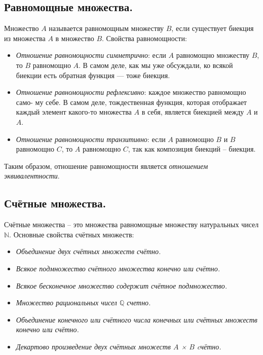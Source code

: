 \documentclass{article}
\begin{document}
\subsection{Равномощные множества.}
Множество $A$ называется равномощным множеству $B$, если существует биекция из множества $A$ в множество $B$.
\newline
Свойства равномощности:
\begin{itemize}
    \item \textit{Отношение равномощности симметрично}: если $A$ равномощно множеству $B$, то $B$ равномощно $A$. В самом деле, как мы уже обсуждали, ко всякой биекции есть обратная функция — тоже биекция.
    \item \textit{Отношение равномощности рефлексивно}: каждое множество равномощно само- му себе. В самом деле, тождественная функция, которая отображает каждый элемент какого-то множества $A$ в себя, является биекцией между $A$ и $A$.
    \item \textit{Отношение равномощности транзитивно}: если $A$ равномощно $B$ и $B$ равномощно $C$, то $A$ равномощно $C$, так как композиция биекций -- биекция.
\end{itemize}
Таким образом, отношение равномощности является \textit{отношением эквивалентности}.


\subsection{Счётные множества.}
Счётные множества -- это множества равномощные множеству натуральных чисел $\mathbb{N}$.
\newline
Основные свойства счётных множеств:
\begin{itemize}
    \item \textit{Объединение двух счётных множеств счётно.}
    \item \textit{Всякое подмножество счётного множества конечно или счётно.}
    \item \textit{Всякое бесконечное множество содержит счётное подмножество.}
    \item \textit{Множество рациональных чисел $\mathbb{Q}$ счетно.}
    \item \textit{Объединение конечного или счётного числа конечных или счётных множеств конечно или счётно.}
    \item \textit{Декартово произведение двух счётных множеств $A$ × $B$ cчётно.}
\end{itemize}
\end{document}
